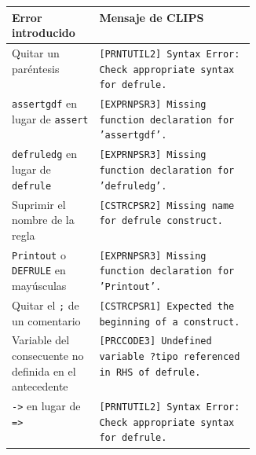 \begin{center}
\small
\begin{tabularx}{\linewidth}{@{}>{\raggedright\arraybackslash}p{0.36\linewidth}Y@{}}
\toprule
Error introducido & Mensaje de CLIPS \\
\midrule
Quitar un paréntesis & \texttt{[PRNTUTIL2] Syntax Error: Check appropriate syntax for defrule.} \\
\texttt{assertgdf} en lugar de \texttt{assert} & \texttt{[EXPRNPSR3] Missing function declaration for 'assertgdf'.} \\
\texttt{defruledg} en lugar de \texttt{defrule} & \texttt{[EXPRNPSR3] Missing function declaration for 'defruledg'.} \\
Suprimir el nombre de la regla & \texttt{[CSTRCPSR2] Missing name for defrule construct.} \\
\texttt{Printout} o \texttt{DEFRULE} en mayúsculas & \texttt{[EXPRNPSR3] Missing function declaration for 'Printout'.} \\
Quitar el \texttt{;} de un comentario & \texttt{[CSTRCPSR1] Expected the beginning of a construct.} \\
Variable del consecuente no definida en el antecedente & \texttt{[PRCCODE3] Undefined variable ?tipo referenced in RHS of defrule.} \\
\texttt{->} en lugar de \texttt{=>} & \texttt{[PRNTUTIL2] Syntax Error: Check appropriate syntax for defrule.} \\
\bottomrule
\end{tabularx}
\end{center}
